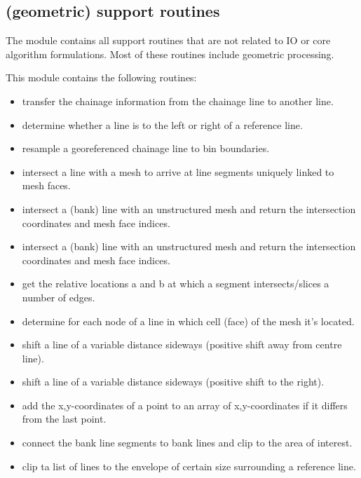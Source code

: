 \subsection{(geometric) support routines }

The  module contains all support routines that are not related to IO or core algorithm formulations.
Most of these routines include geometric processing.

This module contains the following routines:

\begin{itemize}
\item {} transfer the chainage information from the chainage line to another line.
\item {} determine whether a line is to the left or right of a reference line.
\item {} resample a georeferenced chainage line to bin boundaries.
\item {} intersect a line with a mesh to arrive at line segments uniquely linked to mesh faces.
\item {} intersect a (bank) line with an unstructured mesh and return the intersection coordinates and mesh face indices.
\item {} intersect a (bank) line with an unstructured mesh and return the intersection coordinates and mesh face indices.
\item {} get the relative locations a and b at which a segment intersects/slices a number of edges.
\item {} determine for each node of a line in which cell (face) of the mesh it's located.
\item {} shift a line of a variable distance sideways (positive shift away from centre line).
\item {} shift a line of a variable distance sideways (positive shift to the right).
\item {} add the x,y-coordinates of a point to an array of x,y-coordinates if it differs from the last point.
\item {} connect the bank line segments to bank lines and clip to the area of interest.
\item {} clip ta list of lines to the envelope of certain size surrounding a reference line.

\end{itemize}

